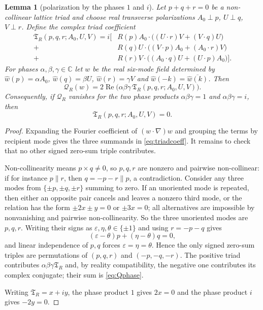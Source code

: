 \documentclass[11pt]{article}
\newtheorem{lemma}[theorem]{Lemma}
\theoremstyle{definition}
\theoremstyle{remark}
\theoremstyle{plain}
\newcommand{\C}{\mathbb{C}}
\newcommand{\Qform}{\mathcal{Q}}
\begin{document}
\begin{lemma}[polarization by the phases $1$ and $i$]
\label{lem:phase}
Let $p+q+r=0$ be a non-collinear lattice triad and choose real transverse
polarizations $A_{0}\perp p$, $U\perp q$, $V\perp r$. Define the complex triad
coefficient
\begin{equation}
\label{eq:triadcoeff}
\begin{aligned}
\mathfrak T_{R}(p,q,r;A_{0},U,V)=i\bigl[{}
&R(p)A_{0}\cdot\bigl((U\cdot r)V+(V\cdot q)U\bigr)\\
{}+{}&R(q)U\cdot\bigl((V\cdot p)A_{0}+(A_{0}\cdot r)V\bigr)\\
{}+{}&R(r)V\cdot\bigl((A_{0}\cdot q)U+(U\cdot p)A_{0}\bigr)
\bigr].
\end{aligned}
\end{equation}
For phases $\alpha,\beta,\gamma\in\C$ let $w$ be the real six-mode field
determined by
$\widehat w(p)=\alpha A_{0}$, $\widehat w(q)=\beta U$,
$\widehat w(r)=\gamma V$ and $\widehat w(-k)=\overline{\widehat w(k)}$. Then
\begin{equation}
\label{eq:Qphase}
\Qform_{R}(w)
=2\operatorname{Re}\bigl(\alpha\beta\gamma\,
\mathfrak T_{R}(p,q,r;A_{0},U,V)\bigr).
\end{equation}
Consequently, if $\Qform_{R}$ vanishes for the two phase products
$\alpha\beta\gamma=1$ and $\alpha\beta\gamma=i$, then
\[
\mathfrak T_{R}(p,q,r;A_{0},U,V)=0 .
\]
\end{lemma}

\begin{proof}
Expanding the Fourier coefficient of $(w\cdot\nabla)w$ and grouping the terms
by recipient mode gives the three summands in \eqref{eq:triadcoeff}. It remains
to check that no other signed zero-sum triple contributes.

Non-collinearity means $p\times q\ne0$, so $p,q,r$ are nonzero and pairwise
non-collinear: if for instance $p\parallel r$, then $q=-p-r\parallel p$, a
contradiction. Consider any three modes from $\{\pm p,\pm q,\pm r\}$ summing to
zero. If an unoriented mode is repeated, then either an opposite pair cancels
and leaves a nonzero third mode, or the relation has the form $\pm2x\pm y=0$
or $\pm3x=0$; all alternatives are impossible by nonvanishing and pairwise
non-collinearity. So the three unoriented modes are $p,q,r$. Writing their
signs as $\varepsilon,\eta,\theta\in\{\pm1\}$ and using $r=-p-q$ gives
\[
(\varepsilon-\theta)p+(\eta-\theta)q=0 ,
\]
and linear independence of $p,q$ forces $\varepsilon=\eta=\theta$. Hence the
only signed zero-sum triples are permutations of $(p,q,r)$ and $(-p,-q,-r)$.
The positive triad contributes $\alpha\beta\gamma\mathfrak T_{R}$ and, by
reality compatibility, the negative one contributes its complex conjugate;
their sum is \eqref{eq:Qphase}.

Writing $\mathfrak T_{R}=x+iy$, the phase product $1$ gives $2x=0$ and the
phase product $i$ gives $-2y=0$.
\end{proof}
\end{document}
